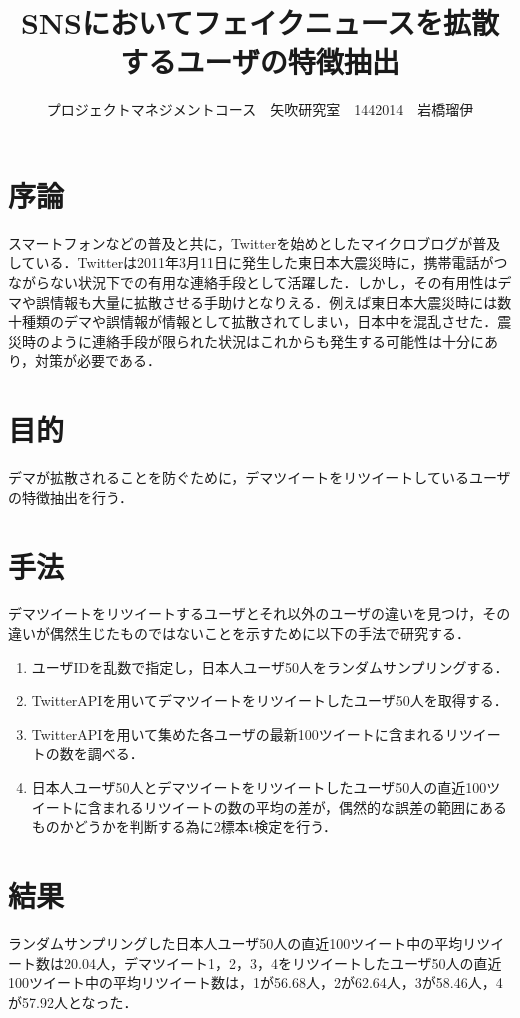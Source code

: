 \documentclass[uplatex,twocolumn,dvipdfmx]{jsarticle}
\title{\vspace{-5mm}\fontsize{14pt}{0pt}\selectfont SNSにおいてフェイクニュースを拡散するユーザの特徴抽出}
\author{\normalsize プロジェクトマネジメントコース　矢吹研究室　1442014　岩橋瑠伊}
\date{}
\begin{document}
\fontsize{10.5pt}{\baselineskip}\selectfont
\maketitle





\section{序論}
スマートフォンなどの普及と共に，Twitterを始めとしたマイクロブログが普及している．Twitterは2011年3月11日に発生した東日本大震災時に，携帯電話がつながらない状況下での有用な連絡手段として活躍した．しかし，その有用性はデマや誤情報も大量に拡散させる手助けとなりえる．例えば東日本大震災時には数十種類のデマや誤情報が情報として拡散されてしまい，日本中を混乱させた．震災時のように連絡手段が限られた状況はこれからも発生する可能性は十分にあり，対策が必要である\cite{dema1}．

\section{目的}
デマが拡散されることを防ぐために，デマツイートをリツイートしているユーザの特徴抽出を行う．

\section{手法}
デマツイートをリツイートするユーザとそれ以外のユーザの違いを見つけ，その違いが偶然生じたものではないことを示すために以下の手法で研究する．
\begin{enumerate}
\item ユーザIDを乱数で指定し，日本人ユーザ50人をランダムサンプリングする．
\item TwitterAPIを用いてデマツイートをリツイートしたユーザ50人を取得する．
\item TwitterAPIを用いて集めた各ユーザの最新100ツイートに含まれるリツイートの数を調べる．
\item 日本人ユーザ50人とデマツイートをリツイートしたユーザ50人の直近100ツイートに含まれるリツイートの数の平均の差が，偶然的な誤差の範囲にあるものかどうかを判断する為に2標本t検定を行う．
\end{enumerate}

\section{結果}
ランダムサンプリングした日本人ユーザ50人の直近100ツイート中の平均リツイート数は20.04人，デマツイート1，2，3，4をリツイートしたユーザ50人の直近100ツイート中の平均リツイート数は，1が56.68人，2が62.64人，3が58.46人，4が57.92人となった．
\end{document}
